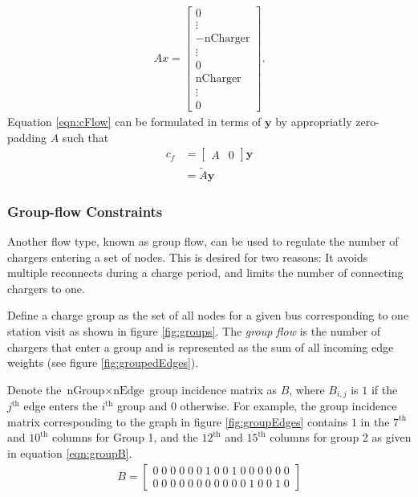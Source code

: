 \begin{align}\label{eqn:cFlow}
	Ax = \begin{bmatrix} 0 \\ \vdots \\ -\text{nCharger} \\ \vdots \\ 0 \\ \text{nCharger} \\ \vdots \\ 0\end{bmatrix}.
\end{align}
Equation \ref{eqn:cFlow} can be formulated in terms of $\mathbf{y}$ by appropriatly zero-padding $A$ such that
\begin{equation}\label{eqn:cFlow2}
	\begin{aligned}
		c_f &= \begin{bmatrix}A & 0 \end{bmatrix}\mathbf{y}\\
		    &= \tilde{A} \mathbf{y} 
	\end{aligned}
\end{equation}
\subsubsection{Group-flow Constraints}
\par Another flow type, known as group flow, can be used to regulate the number of chargers entering a set of nodes. This is desired for two reasons:  It avoids multiple reconnects during a charge period, and limits the number of connecting chargers to one. 
\par Define a charge group as the set of all nodes for a given bus corresponding to one station visit as shown in figure \ref{fig:groups}. The \textit{group flow} is the number of chargers that enter a group and is represented as the sum of all incoming edge weights (see figure \ref{fig:groupedEdges}). 
\par Denote the $\text{nGroup} \times \text{nEdge}$ group incidence matrix as $B$, where $B_{i,j}$ is $1$ if the $j^{\text{th}}$ edge enters the $i^{\text{th}}$ group and $0$ otherwise. For example, the group incidence matrix corresponding to the graph in figure \ref{fig:groupEdges} contains $1$ in the $7^{\text{th}}$ and $10^{\text{th}}$ columns for Group 1, and the $12^{\text{th}}$ and $15^{\text{th}}$ columns for group 2 as given in equation \ref{eqn:groupB}.
\begin{align}\label{eqn:groupB}
	B = \begin{bmatrix}0 \; 0 \; 0 \; 0 \; 0 \; 0 \; 1 \; 0 \; 0 \; 1 \; 0 \; 0 \; 0 \; 0 \; 0 \; 0\\
	                   0 \; 0 \; 0 \; 0 \; 0 \; 0 \; 0 \; 0 \; 0 \; 0 \; 0 \; 1 \; 0 \; 0 \; 1 \; 0\end{bmatrix}
\end{align}


